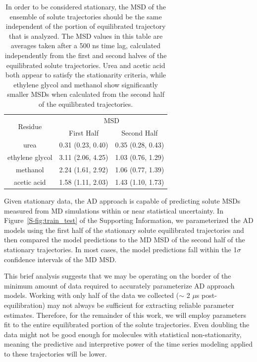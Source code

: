 \documentclass[journal=jctcce,manuscript=article]{achemso}
\begin{document}
  \begin{table}[h]
  \centering
  \begin{tabular}{|c|c|c|}
  \hline
  \multirow{2}{*}{Residue} & \multicolumn{2}{c|}{MSD}            \\\cline{2-3}
                           & First Half       & Second Half      \\\hline
  urea                     & 0.31 (0.23, 0.40)& 0.35 (0.28, 0.43)\\\hline
  ethylene glycol          & 3.11 (2.06, 4.25)& 1.03 (0.76, 1.29)\\\hline
  methanol                 & 2.24 (1.61, 2.92)& 1.06 (0.77, 1.39)\\\hline
  acetic acid              & 1.58 (1.11, 2.03)& 1.43 (1.10, 1.73)\\\hline

  \end{tabular}
  \caption{In order to be considered stationary, the MSD of the ensemble of
	  solute trajectories should be the same independent of the portion of
	  equilibrated trajectory that is analyzed. The MSD values in this
	  table are averages taken after a 500 ns time lag, calculated
	  independently from the first and second halves of the equilibrated
	  solute trajectories. Urea and acetic acid both appear to satisfy the
	  stationarity criteria, while ethylene glycol and methanol show
	  significantly smaller MSDs when calculated from the second half of
	  the equilibrated trajectories.}\label{table:stationarity}
  \end{table}

  Given stationary data, the AD approach is capable of predicting solute MSDs
  measured from MD simulations within or near statistical uncertainty. In
  Figure~\ref{S-fig:train_test} of the Supporting Information, we parameterized
  the AD models using the first half of the stationary solute equilibrated
  trajectories and then compared the model predictions to the MD MSD of the
  second half of the stationary trajectories. In most cases, the model
  predictions fall within the 1$\sigma$ confidence intervals of the MD MSD.
  
  This brief analysis suggests that we may be operating on the border of the
  minimum amount of data required to accurately parameterize AD approach
  models. Working with only half of the data we collected ($\sim$ 2 $\mu$s
  post-equilibration) may not always be sufficient for extracting reliable
  parameter estimates. Therefore, for the remainder of this work, we will
  employ parameters fit to the entire equilibrated portion of the solute
  trajectories. Even doubling the data might not be good enough for molecules
  with statistical non-stationarity, meaning the predictive and interpretive
  power of the time series modeling applied to these trajectories will be
  lower.
\end{document}
